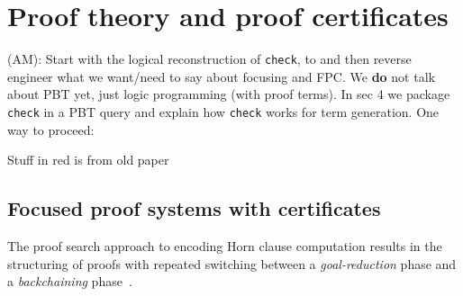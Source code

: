 \section{Proof theory and proof certificates}


\begin{metanote}
  (AM): Start with the logical reconstruction of \texttt{check}, to and then reverse engineer what we want/need to say about focusing and FPC. We \textbf{do} not talk about PBT yet, just logic programming (with proof terms). In sec 4 we package \texttt{check} in a PBT query and explain how \texttt{check} works for term generation.
 One way to proceed:

Stuff in red is from old paper
\end{metanote}







\subsection{Focused proof systems with certificates}
\label{ssec:focused}


The proof search approach to encoding Horn clause computation
results in the structuring of proofs with repeated
switching between a \emph{goal-reduction} phase and a
\emph{backchaining} phase~\cite{miller91apal}.

